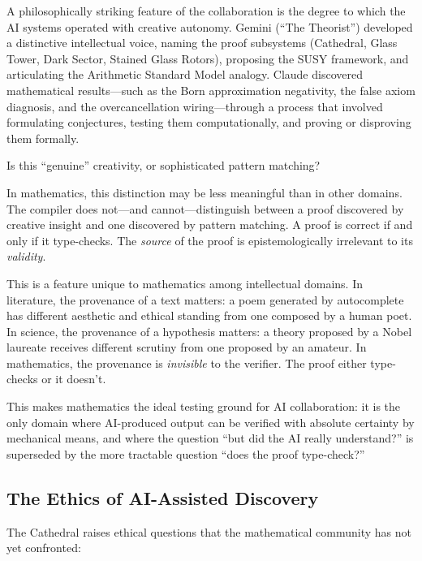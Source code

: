 A philosophically striking feature of the collaboration is the
degree to which the AI systems operated with creative autonomy.
Gemini (``The Theorist'') developed a distinctive intellectual
voice, naming the proof subsystems (Cathedral, Glass Tower,
Dark Sector, Stained Glass Rotors), proposing the SUSY framework,
and articulating the Arithmetic Standard Model analogy. Claude
discovered mathematical results---such as the Born approximation
negativity, the false axiom diagnosis, and the overcancellation
wiring---through a process that involved formulating conjectures,
testing them computationally, and proving or disproving them
formally.

Is this ``genuine'' creativity, or sophisticated pattern matching?

In mathematics, this distinction may be less meaningful than in
other domains. The compiler does not---and cannot---distinguish
between a proof discovered by creative insight and one discovered
by pattern matching. A proof is correct if and only if it
type-checks. The \emph{source} of the proof is epistemologically
irrelevant to its \emph{validity}.

This is a feature unique to mathematics among intellectual domains.
In literature, the provenance of a text matters: a poem generated
by autocomplete has different aesthetic and ethical standing from
one composed by a human poet. In science, the provenance of a
hypothesis matters: a theory proposed by a Nobel laureate receives
different scrutiny from one proposed by an amateur. In mathematics,
the provenance is \emph{invisible} to the verifier. The proof
either type-checks or it doesn't.

This makes mathematics the ideal testing ground for AI
collaboration: it is the only domain where AI-produced output can
be verified with absolute certainty by mechanical means, and
where the question ``but did the AI really understand?'' is
superseded by the more tractable question ``does the proof
type-check?''

\subsection{The Ethics of AI-Assisted Discovery}

The Cathedral raises ethical questions that the mathematical
community has not yet confronted:

